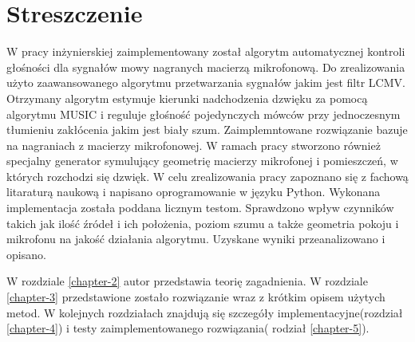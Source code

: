 \chapter*{Streszczenie}


W pracy inżynierskiej zaimplementowany został algorytm automatycznej kontroli głośności dla sygnałów mowy nagranych macierzą mikrofonową. Do zrealizowania użyto zaawansowanego algorytmu przetwarzania sygnałów jakim jest filtr LCMV. Otrzymany algorytm estymuje kierunki nadchodzenia dzwięku za pomocą algorytmu MUSIC i reguluje głośność pojedynczych mówców przy jednoczesnym tłumieniu zakłócenia jakim jest biały szum. Zaimplemntowane rozwiązanie bazuje na nagraniach z macierzy mikrofonowej. W ramach pracy stworzono również specjalny generator symulujący geometrię macierzy mikrofonej i pomieszczeń, w których rozchodzi się dzwięk. W celu zrealizowania pracy zapoznano się z fachową litaraturą naukową i napisano oprogramowanie w języku Python. Wykonana implementacja została poddana licznym testom. Sprawdzono wpływ czynników takich jak ilość źródeł i ich położenia, poziom szumu a także geometria pokoju i mikrofonu na jakość działania algorytmu. Uzyskane wyniki przeanalizowano i opisano. 

W rozdziale \ref{chapter-2} autor przedstawia teorię zagadnienia. W rozdziale \ref{chapter-3} przedstawione zostało rozwiązanie wraz z krótkim opisem użytych metod. W kolejnych rozdziałach znajdują się szczegóły implementacyjne(rozdział \ref{chapter-4}) i testy zaimplementowanego rozwiązania( rodział \ref{chapter-5}).